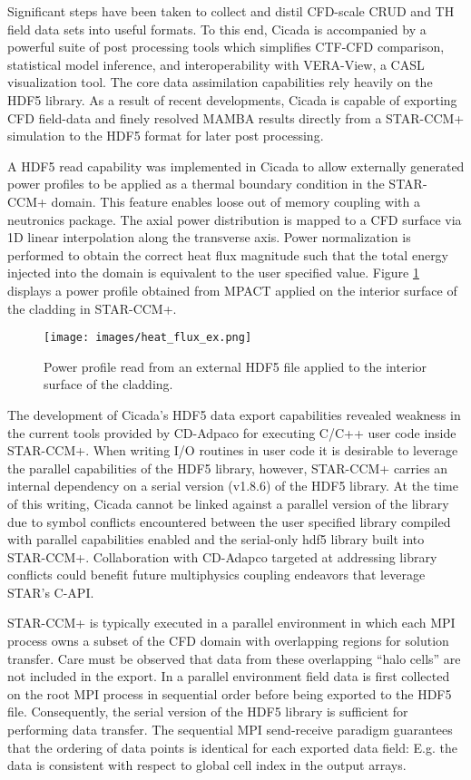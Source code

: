 Significant steps have been taken to collect and distil CFD-scale CRUD and TH field data sets into useful formats.  To this end, Cicada is accompanied by a powerful suite of post processing tools which simplifies CTF-CFD comparison, statistical model inference, and interoperability with VERA-View, a CASL visualization tool. The core data assimilation capabilities rely heavily on the HDF5 library.  As a result of recent developments, Cicada is capable of exporting CFD field-data and finely resolved MAMBA results directly from a STAR-CCM+ simulation to the HDF5 format for later post processing.  

A HDF5 read capability was implemented in Cicada to allow externally generated power profiles to be applied as a thermal boundary condition in the STAR-CCM+ domain.  This feature enables loose out of memory coupling with a neutronics package. 
The axial power distribution is mapped to a CFD surface via 1D linear interpolation along the transverse axis.  Power normalization is performed to obtain the correct heat flux magnitude such that the total energy injected into the domain is equivalent to the user specified value.   Figure \ref{fig:heat_flux_ex} displays a power profile obtained from MPACT applied on the interior surface of the cladding in STAR-CCM+.

\begin{figure}[hbtp]
\centering
\texttt{[image: images/heat\_flux\_ex.png]}
\caption{Power profile read from an external HDF5 file applied to the interior surface of the cladding.}
\label{fig:heat_flux_ex}
\end{figure}

The development of Cicada's HDF5 data export capabilities revealed weakness in the current tools provided by CD-Adpaco for executing C/C++ user code inside STAR-CCM+.  When writing I/O routines in user code it is desirable to leverage the parallel capabilities of the HDF5 library, however, STAR-CCM+ carries an internal dependency on a serial version (v1.8.6) of the HDF5 library.  At the time of this writing, Cicada cannot be linked against a parallel version of the library due to symbol conflicts encountered between the user specified library compiled with parallel capabilities enabled and the serial-only hdf5 library built into STAR-CCM+.
Collaboration with CD-Adapco targeted at addressing library conflicts could benefit future multiphysics coupling endeavors that leverage STAR's C-API.

STAR-CCM+ is typically executed in a parallel environment in which each MPI process owns a subset of the CFD domain with overlapping regions for solution transfer.  Care must be observed that data from these overlapping ``halo cells'' are not included in the export.  In a parallel environment field data is first collected on the root MPI process in sequential order before being exported to the HDF5 file.  Consequently, the serial version of the HDF5 library is sufficient for performing data transfer.  The sequential MPI send-receive paradigm guarantees that the ordering of data points is identical for each exported data field: E.g. the data is consistent with respect to global cell index in the output arrays.   

